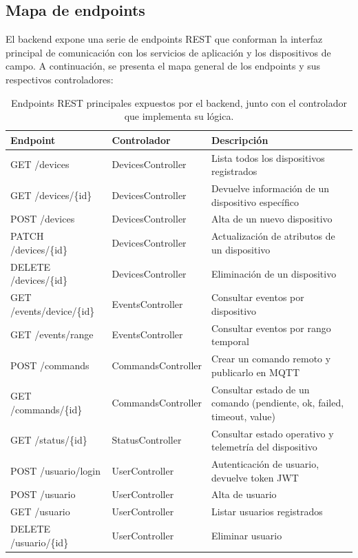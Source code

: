 \subsection{Mapa de endpoints}

El backend expone una serie de endpoints REST que conforman la interfaz principal de comunicación con los servicios de aplicación y los dispositivos de campo.  
A continuación, se presenta el mapa general de los endpoints y sus respectivos controladores:

\begin{table}[H]
	\centering
	\caption[Endpoints REST principales]{Endpoints REST principales expuestos por el backend, junto con el controlador que implementa su lógica.}
	\begin{tabular}{l l p{4.5cm}}    
		\toprule
		\textbf{Endpoint} & \textbf{Controlador} & \textbf{Descripción} \\
		\midrule
		GET /devices & DevicesController & Lista todos los dispositivos registrados \\
		GET /devices/\{id\} & DevicesController & Devuelve información de un dispositivo específico \\
		POST /devices & DevicesController & Alta de un nuevo dispositivo \\
		PATCH /devices/\{id\} & DevicesController & Actualización de atributos de un dispositivo \\
		DELETE /devices/\{id\} & DevicesController & Eliminación de un dispositivo \\
		\addlinespace
		GET /events/device/\{id\} & EventsController & Consultar eventos por dispositivo \\
		GET /events/range & EventsController & Consultar eventos por rango temporal \\
		\addlinespace
		POST /commands & CommandsController & Crear un comando remoto y publicarlo en MQTT \\
		GET /commands/\{id\} & CommandsController & Consultar estado de un comando (pendiente, ok, failed, timeout, value) \\
		\addlinespace
		GET /status/\{id\} & StatusController & Consultar estado operativo y telemetría del dispositivo \\
		\addlinespace
		POST /usuario/login & UserController & Autenticación de usuario, devuelve token JWT \\
		POST /usuario & UserController & Alta de usuario \\
		GET /usuario & UserController & Listar usuarios registrados \\
		DELETE /usuario/\{id\} & UserController & Eliminar usuario \\
		\bottomrule
		\hline
	\end{tabular}
	\label{tab:endpoints}
\end{table}


